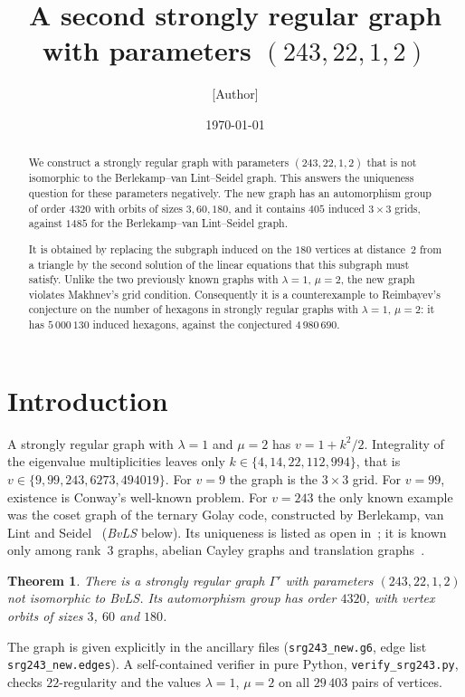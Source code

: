 \documentclass[11pt]{amsart}
\title{A second strongly regular graph with parameters $(243,22,1,2)$}
\author{[Author]}
\date{\today}
\newtheorem{theorem}{Theorem}
\theoremstyle{remark}
\begin{document}
\begin{abstract}
We construct a strongly regular graph with parameters $(243,22,1,2)$ that is not isomorphic to the
Berlekamp--van Lint--Seidel graph. This answers the uniqueness question for these parameters negatively. The new graph
has an automorphism group of order $4320$ with orbits of sizes $3,60,180$, and it contains $405$ induced $3\times3$
grids, against $1485$ for the Berlekamp--van Lint--Seidel graph.

It is obtained by replacing the subgraph induced on the $180$ vertices at distance~$2$ from a triangle by the second
solution of the linear equations that this subgraph must satisfy. Unlike the two previously known graphs with
$\lambda=1$, $\mu=2$, the new graph violates Makhnev's grid condition. Consequently it is a counterexample to
Reimbayev's conjecture on the number of hexagons in strongly regular graphs with $\lambda=1$, $\mu=2$: it has
$5\,000\,130$ induced hexagons, against the conjectured $4\,980\,690$.
\end{abstract}
\maketitle

\section{Introduction}
A strongly regular graph with $\lambda=1$ and $\mu=2$ has $v=1+k^2/2$. Integrality of the eigenvalue multiplicities
leaves only $k\in\{4,14,22,112,994\}$, that is $v\in\{9,99,243,6273,494019\}$. For $v=9$ the graph is the $3\times3$
grid. For $v=99$, existence is Conway's well-known problem. For $v=243$ the only known example was the coset graph of
the ternary Golay code, constructed by Berlekamp, van Lint and Seidel~\cite{BvLS} (\emph{BvLS} below). Its uniqueness is
listed as open in~\cite{BvM,Btab,Zaw}; it is known only among rank~$3$ graphs, abelian Cayley graphs and translation
graphs~\cite{BvM}.

\begin{theorem}\label{thm:main}
There is a strongly regular graph $\Gamma'$ with parameters $(243,22,1,2)$ not isomorphic to BvLS. Its automorphism
group has order $4320$, with vertex orbits of sizes $3$, $60$ and $180$.
\end{theorem}

The graph is given explicitly in the ancillary files (\texttt{srg243\_new.g6}, edge list \texttt{srg243\_new.edges}).
A self-contained verifier in pure Python, \texttt{verify\_srg243.py}, checks $22$-regularity and the values $\lambda=1$,
$\mu=2$ on all $29\,403$ pairs of vertices.
\end{document}
